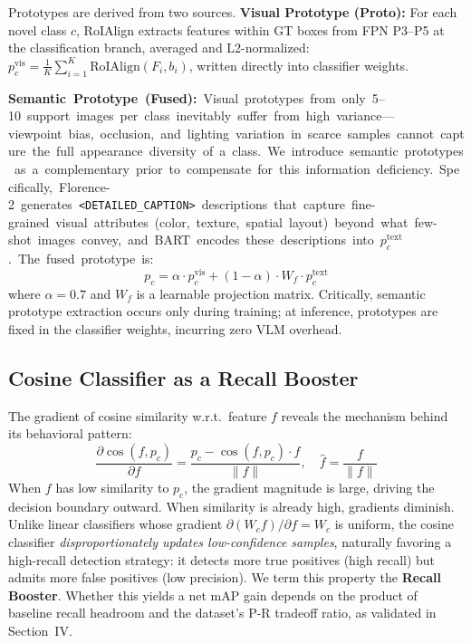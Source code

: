 \documentclass[conference]{IEEEtran}
\newcommand{\myhl}[1]{\colorbox{hlc}{\mbox{#1}}}
\begin{document}
Prototypes are derived from two sources. \textbf{Visual Prototype (Proto):} For each novel class $c$, RoIAlign extracts features within GT boxes from FPN P3--P5 at the classification branch, averaged and L2-normalized: $p_c^{\text{vis}} = \frac{1}{K}\sum_{i=1}^K \text{RoIAlign}(F_i, b_i)$, written directly into classifier weights.

\myhl{\textbf{Semantic Prototype (Fused):} Visual prototypes from only 5--10 support images per class inevitably suffer from high variance---viewpoint bias, occlusion, and lighting variation in scarce samples cannot capture the full appearance diversity of a class. We introduce semantic prototypes as a complementary prior to compensate for this information deficiency. Specifically, Florence-2 generates \texttt{<DETAILED\_CAPTION>} descriptions that capture fine-grained visual attributes (color, texture, spatial layout) beyond what few-shot images convey, and BART encodes these descriptions into $p_c^{\text{text}}$. The fused prototype is:}
\begin{equation}
p_c = \alpha \cdot p_c^{\text{vis}} + (1 - \alpha) \cdot W_f \cdot p_c^{\text{text}}
\label{eq:fused}
\end{equation}
where $\alpha=0.7$ and $W_f$ is a learnable projection matrix. Critically, semantic prototype extraction occurs only during training; at inference, prototypes are fixed in the classifier weights, incurring zero VLM overhead.

\subsection{Cosine Classifier as a Recall Booster}

The gradient of cosine similarity w.r.t.\ feature $f$ reveals the mechanism behind its behavioral pattern:
\begin{equation}
\frac{\partial \cos(f, p_c)}{\partial f} = \frac{p_c - \cos(f, p_c) \cdot \hat{f}}{\|f\|}, \quad \hat{f} = \frac{f}{\|f\|}
\label{eq:gradient}
\end{equation}
When $f$ has low similarity to $p_c$, the gradient magnitude is large, driving the decision boundary outward. When similarity is already high, gradients diminish. Unlike linear classifiers whose gradient $\partial(W_c f)/\partial f = W_c$ is uniform, the cosine classifier \textit{disproportionately updates low-confidence samples}, naturally favoring a high-recall detection strategy: it detects more true positives (high recall) but admits more false positives (low precision). We term this property the \textbf{Recall Booster}. Whether this yields a net mAP gain depends on the product of baseline recall headroom and the dataset's P-R tradeoff ratio, as validated in Section~IV.
\end{document}
